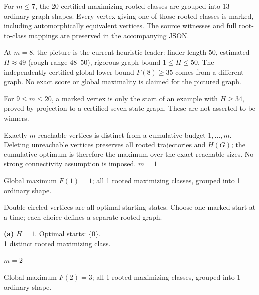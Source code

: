 \documentclass[11pt,a4paper]{article}
\begin{document}
For $m\le7$, the 20 certified maximizing rooted classes are grouped into 13 ordinary graph shapes. Every vertex giving one of those rooted classes is marked, including automorphically equivalent vertices. The source witnesses and full root-to-class mappings are preserved in the accompanying JSON.\par\vspace{2mm}
At $m=8$, the picture is the current heuristic leader: finder length $50$, estimated $H\approx49$ (rough range $48$--$50$), rigorous graph bound $1\le H\le50$. The independently certified global lower bound $F(8)\ge35$ comes from a different graph. No exact score or global maximality is claimed for the pictured graph.\par\vspace{2mm}
For $9\le m\le20$, a marked vertex is only the start of an example with $H\ge34$, proved by projection to a certified seven-state graph. These are not asserted to be winners.\par\vspace{2mm}
Exactly $m$ reachable vertices is distinct from a cumulative budget $1,\ldots,m$. Deleting unreachable vertices preserves all rooted trajectories and $H(G)$; the cumulative optimum is therefore the maximum over the exact reachable sizes. No strong connectivity assumption is imposed.
\clearpage
{\LARGE\bfseries $m=1$}\par\vspace{3mm}
Global maximum $F(1)=1$; all 1 rooted maximizing classes, grouped into 1 ordinary shape.\par\vspace{2mm}
Double-circled vertices are all optimal starting states. Choose one marked start at a time; each choice defines a separate rooted graph.\par\vspace{3mm}
\begin{minipage}[t]{.94\textwidth}\centering
\resizebox{10.3cm}{!}{}\par
\small\textbf{(a)} $H=1$. Optimal starts: $\{0\}$.\\1 distinct rooted maximizing class.\par\end{minipage}
\clearpage
{\LARGE\bfseries $m=2$}\par\vspace{3mm}
Global maximum $F(2)=3$; all 1 rooted maximizing classes, grouped into 1 ordinary shape.\par\vspace{2mm}
\end{document}
